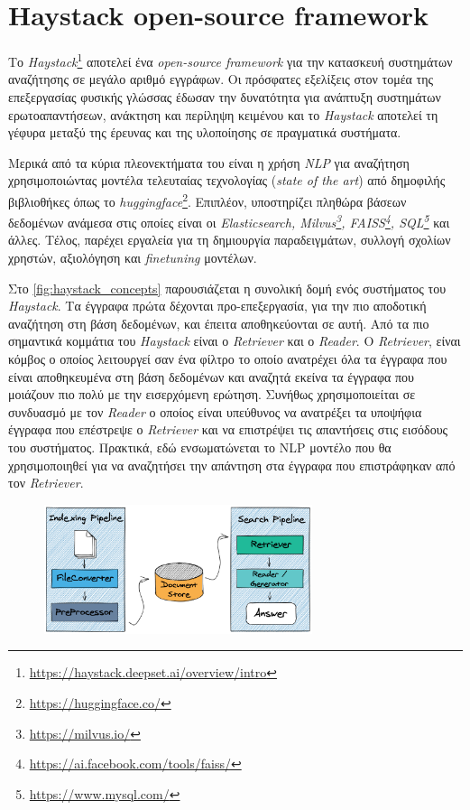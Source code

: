 \section{Haystack open-source framework}
\label{sec:haystack}
Το \emph{Haystack}\footnote{\url{https://haystack.deepset.ai/overview/intro}} αποτελεί ένα \emph{open-source framework} για την κατασκευή συστημάτων αναζήτησης σε μεγάλο αριθμό εγγράφων. Οι πρόσφατες εξελίξεις στον τομέα της επεξεργασίας φυσικής γλώσσας έδωσαν την δυνατότητα για ανάπτυξη συστημάτων ερωτοαπαντήσεων, ανάκτηση και περίληψη κειμένου και το \emph{Haystack} αποτελεί τη γέφυρα μεταξύ της έρευνας και της υλοποίησης σε πραγματικά συστήματα.

Μερικά από τα κύρια πλεονεκτήματα του είναι η χρήση \emph{NLP} για αναζήτηση χρησιμοποιώντας μοντέλα τελευταίας τεχνολογίας (\emph{state of the art}) από δημοφιλής βιβλιοθήκες όπως το \emph{huggingface}\footnote{\url{https://huggingface.co/}}. Επιπλέον, υποστηρίζει πληθώρα βάσεων δεδομένων ανάμεσα στις οποίες είναι οι \emph{Elasticsearch, Milvus\footnote{\url{https://milvus.io/}}, FAISS\footnote{\url{https://ai.facebook.com/tools/faiss/}}, SQL\footnote{\url{https://www.mysql.com/}}} και άλλες. Τέλος, παρέχει εργαλεία για τη δημιουργία παραδειγμάτων, συλλογή σχολίων χρηστών, αξιολόγηση και \emph{finetuning} μοντέλων. 

Στο \autoref{fig:haystack_concepts} παρουσιάζεται η συνολική δομή ενός συστήματος του \emph{Haystack}. Τα έγγραφα πρώτα δέχονται προ-επεξεργασία, για την πιο αποδοτική αναζήτηση στη βάση δεδομένων, και έπειτα αποθηκεύονται σε αυτή. Από τα πιο σημαντικά κομμάτια του \emph{Haystack} είναι ο \emph{Retriever} και ο \emph{Reader}. Ο \emph{Retriever}, είναι κόμβος ο οποίος λειτουργεί σαν ένα φίλτρο το οποίο ανατρέχει όλα τα έγγραφα που είναι αποθηκευμένα στη βάση δεδομένων και αναζητά εκείνα τα έγγραφα που μοιάζουν πιο πολύ με την εισερχόμενη ερώτηση. Συνήθως χρησιμοποιείται σε συνδυασμό με τον \emph{Reader} ο οποίος είναι υπεύθυνος να ανατρέξει τα υποψήφια έγγραφα που επέστρεψε ο \emph{Retriever} και να επιστρέψει τις απαντήσεις στις εισόδους του συστήματος. Πρακτικά, εδώ ενσωματώνεται το NLP μοντέλο που θα χρησιμοποιηθεί για να αναζητήσει την απάντηση στα έγγραφα που επιστράφηκαν από τον \emph{Retriever}.

\begin{figure}[!ht]
  \centering
  \captionsetup{justification=centering}
  \includegraphics[width=0.7\textwidth]{images/chapter3/concepts_haystack_handdrawn.png}
  \label{fig:haystack_concepts}
\end{figure}
\noindent